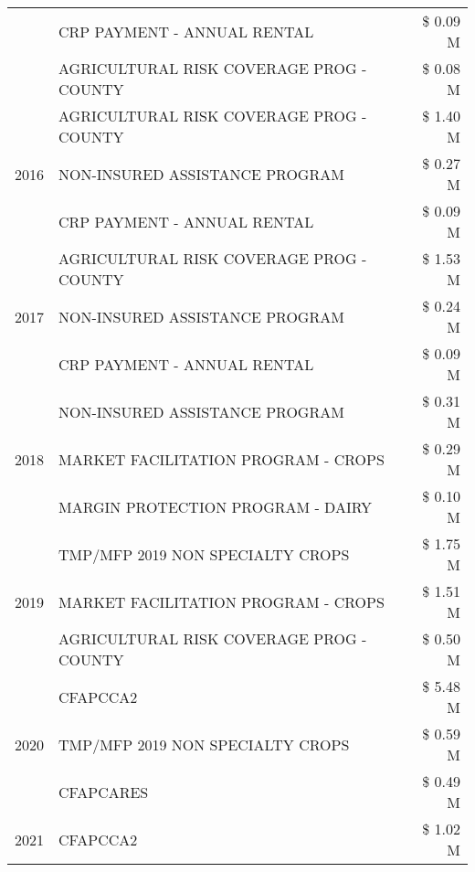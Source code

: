 \begin{tabular}{llr}
 & CRP PAYMENT - ANNUAL RENTAL & \$ 0.09 M \\
 & AGRICULTURAL RISK COVERAGE PROG - COUNTY & \$ 0.08 M \\
\cline{1-3}
\multirow[t]{3}{*}{2016} & AGRICULTURAL RISK COVERAGE PROG - COUNTY & \$ 1.40 M \\
 & NON-INSURED ASSISTANCE PROGRAM & \$ 0.27 M \\
 & CRP PAYMENT - ANNUAL RENTAL & \$ 0.09 M \\
\cline{1-3}
\multirow[t]{3}{*}{2017} & AGRICULTURAL RISK COVERAGE PROG - COUNTY & \$ 1.53 M \\
 & NON-INSURED ASSISTANCE PROGRAM & \$ 0.24 M \\
 & CRP PAYMENT - ANNUAL RENTAL & \$ 0.09 M \\
\cline{1-3}
\multirow[t]{3}{*}{2018} & NON-INSURED ASSISTANCE PROGRAM & \$ 0.31 M \\
 & MARKET FACILITATION PROGRAM - CROPS & \$ 0.29 M \\
 & MARGIN PROTECTION PROGRAM - DAIRY & \$ 0.10 M \\
\cline{1-3}
\multirow[t]{3}{*}{2019} & TMP/MFP 2019 NON SPECIALTY CROPS & \$ 1.75 M \\
 & MARKET FACILITATION PROGRAM - CROPS & \$ 1.51 M \\
 & AGRICULTURAL RISK COVERAGE PROG - COUNTY & \$ 0.50 M \\
\cline{1-3}
\multirow[t]{3}{*}{2020} & CFAPCCA2 & \$ 5.48 M \\
 & TMP/MFP 2019 NON SPECIALTY CROPS & \$ 0.59 M \\
 & CFAPCARES & \$ 0.49 M \\
\cline{1-3}
2021 & CFAPCCA2 & \$ 1.02 M \\
\cline{1-3}
\bottomrule
\end{tabular}
